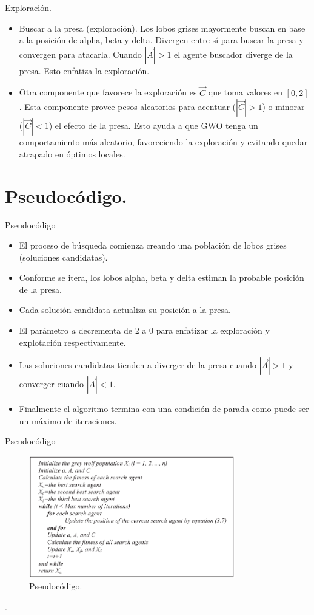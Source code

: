 \documentclass[a4paper,11pt]{beamer}
\begin{document}
\begin{frame}{Exploración.}
	\begin{itemize}
		\item Buscar a la presa (exploración). 	Los lobos grises mayormente buscan en base a la posición de alpha, beta y delta. Divergen entre sí para buscar la presa y convergen para atacarla. Cuando $|\vec{A}|>1$ el agente buscador diverge de la presa. Esto enfatiza la exploración. \\
	
		\item Otra componente que favorece la exploración es $\vec{C}$ que toma valores en $[0,2]$. Esta componente provee pesos aleatorios para acentuar ($|\vec{C}|>1$) o minorar ($|\vec{C}|<1$) el efecto de la presa. Esto ayuda a que GWO tenga un comportamiento más aleatorio, favoreciendo la exploración y evitando quedar atrapado en óptimos locales.
	\end{itemize}

\end{frame}


\section{Pseudocódigo.}
\begin{frame}{Pseudocódigo} 
	 \begin{itemize}
	 	\item El proceso de búsqueda comienza creando una población de lobos grises (soluciones candidatas). 
	 	\item Conforme se itera, los lobos alpha, beta y delta estiman la probable posición de la presa. 
	 	\item Cada solución candidata actualiza su posición a la presa. 
	 	\item El parámetro $a$ decrementa de 2 a 0 para enfatizar la exploración y explotación respectivamente. 
	 	\item Las soluciones candidatas tienden a diverger de la presa cuando $|\vec{A}|>1$ y converger cuando $|\vec{A}|<1$. 
	 	\item Finalmente el algoritmo termina con una condición de parada como puede ser un máximo de iteraciones.
	\end{itemize}
	

\end{frame}

\begin{frame}{Pseudocódigo}
    \begin{figure}[H]
		\centering
		\includegraphics[width=0.8\textwidth]{images/gwo_pseudocode.png}
		\caption{Pseudocódigo.}
	\end{figure}.    
\end{frame}
\end{document}
